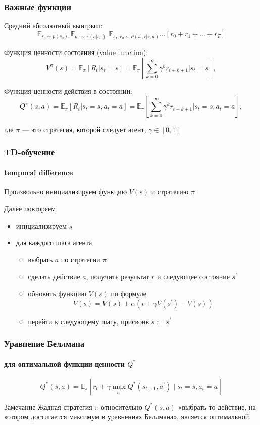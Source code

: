 \documentclass[fullscreen=true, bookmarks=true, hyperref={pdfencoding=unicode}]{beamer}
\begin{document}
\begin{frame}
  \frametitle{Важные функции}
  Средний абсолютный выигрыш:
  $$ \mathbb{E}_{s_0 \sim p(s_0),} \mathbb{E}_{a_0 \sim \pi(a|s_0),} \mathbb{E}_{s_1, r_0 \sim P(s^\prime,r|s, a)} \dots \left[r_0 + r_1 + \dots + r_T \right]$$

  Функция ценности состояния (value function):
  $$ V^{\pi} (s) = \mathbb{E}_\pi [R_t|s_t = s] =
  \mathbb{E}_\pi \left[\sum\limits_{k=0}^\infty \gamma^k r_{t+k+1} | s_t = s \right],$$

  Функция ценности действия в состоянии:
  $$ Q^{\pi} (s, a) = \mathbb{E}_\pi [R_t|s_t = s, a_t = a] =
  \mathbb{E}_\pi \left[\sum\limits_{k=0}^\infty \gamma^k r_{t+k+1} | s_t = s, a_t = a \right],$$

  где $\pi$ — это стратегия, которой следует агент, $\gamma \in [0, 1]$

\end{frame}


\begin{frame}
  \frametitle{TD-обучение}
  \framesubtitle{temporal difference}

  Произвольно инициализируем функцию $V(s)$ и стратегию $\pi$

  Далее повторяем
  \begin{itemize}
    \item инициализируем $s$
    \item для каждого шага агента
      \begin{itemize}
        \item выбрать $a$ по стратегии $\pi$
        \item сделать действие $a$, получить результат $r$ и следующее состояние $s^\prime$
        \item обновить функцию $V(s)$ по формуле
        $$ V(s) = V(s) + \alpha \left(r + \gamma V(s^\prime) - V(s) \right)$$
        \item перейти к следующему шагу, присвоив $s := s^\prime$
      \end{itemize}
  \end{itemize}
\end{frame}


\begin{frame}
  \frametitle{Уравнение Беллмана}
  \framesubtitle{для оптимальной функции ценности $Q^*$}

  $$ Q^* (s,a) = \mathbb{E}_\pi \left[r_t + \gamma \max\limits_{a^\prime} Q^* (s_{t+1},a^\prime) \mid s_t = s, a_t = a \right]$$

  \vspace{1cm}
  \begin{block}{Замечание}
    Жадная стратегия $\pi$ относительно $Q^*(s,a)$ «выбрать то действие, на котором достигается максимум в уравнениях Беллмана», является оптимальной.
  \end{block}

\end{frame}
\end{document}
